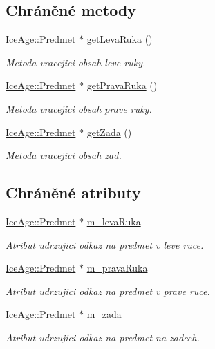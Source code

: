 \subsection*{Chráněné metody}
\begin{DoxyCompactItemize}
\item 
\hyperlink{classIceAge_1_1Predmet}{Ice\+Age\+::\+Predmet} $\ast$ \hyperlink{classIceAge_1_1ObleceneVybaveniHumanoid_ad18de8b1113a4f9ad05395a001f36789}{get\+Leva\+Ruka} ()
\begin{DoxyCompactList}\small\item\em Metoda vracejici obsah leve ruky. \end{DoxyCompactList}\item 
\hyperlink{classIceAge_1_1Predmet}{Ice\+Age\+::\+Predmet} $\ast$ \hyperlink{classIceAge_1_1ObleceneVybaveniHumanoid_ad02565a4aa9699e4f348c82138549d8a}{get\+Prava\+Ruka} ()
\begin{DoxyCompactList}\small\item\em Metoda vracejici obsah prave ruky. \end{DoxyCompactList}\item 
\hyperlink{classIceAge_1_1Predmet}{Ice\+Age\+::\+Predmet} $\ast$ \hyperlink{classIceAge_1_1ObleceneVybaveniHumanoid_a09bc35539f98568a5fe37be79abebd3e}{get\+Zada} ()
\begin{DoxyCompactList}\small\item\em Metoda vracejici obsah zad. \end{DoxyCompactList}\end{DoxyCompactItemize}
\subsection*{Chráněné atributy}
\begin{DoxyCompactItemize}
\item 
\hyperlink{classIceAge_1_1Predmet}{Ice\+Age\+::\+Predmet} $\ast$ \hyperlink{classIceAge_1_1ObleceneVybaveniHumanoid_aab35aa50c2707e31f7f86509d75aed32}{m\+\_\+leva\+Ruka}
\begin{DoxyCompactList}\small\item\em Atribut udrzujici odkaz na predmet v leve ruce. \end{DoxyCompactList}\item 
\hyperlink{classIceAge_1_1Predmet}{Ice\+Age\+::\+Predmet} $\ast$ \hyperlink{classIceAge_1_1ObleceneVybaveniHumanoid_aff9f64fece90fb80a02896126120c933}{m\+\_\+prava\+Ruka}
\begin{DoxyCompactList}\small\item\em Atribut udrzujici odkaz na predmet v prave ruce. \end{DoxyCompactList}\item 
\hyperlink{classIceAge_1_1Predmet}{Ice\+Age\+::\+Predmet} $\ast$ \hyperlink{classIceAge_1_1ObleceneVybaveniHumanoid_a1dc766d8630d59c3690be0ea73848554}{m\+\_\+zada}
\begin{DoxyCompactList}\small\item\em Atribut udrzujici odkaz na predmet na zadech. \end{DoxyCompactList}\end{DoxyCompactItemize}


